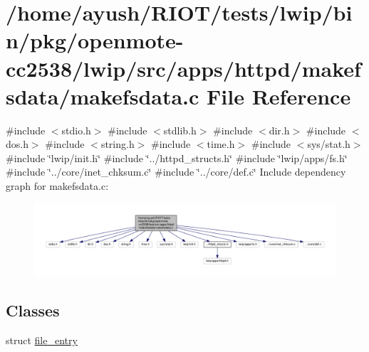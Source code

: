 \hypertarget{openmote-cc2538_2lwip_2src_2apps_2httpd_2makefsdata_2makefsdata_8c}{}\section{/home/ayush/\+R\+I\+O\+T/tests/lwip/bin/pkg/openmote-\/cc2538/lwip/src/apps/httpd/makefsdata/makefsdata.c File Reference}
\label{openmote-cc2538_2lwip_2src_2apps_2httpd_2makefsdata_2makefsdata_8c}
{\ttfamily \#include $<$stdio.\+h$>$}\newline
{\ttfamily \#include $<$stdlib.\+h$>$}\newline
{\ttfamily \#include $<$dir.\+h$>$}\newline
{\ttfamily \#include $<$dos.\+h$>$}\newline
{\ttfamily \#include $<$string.\+h$>$}\newline
{\ttfamily \#include $<$time.\+h$>$}\newline
{\ttfamily \#include $<$sys/stat.\+h$>$}\newline
{\ttfamily \#include \char`\"{}lwip/init.\+h\char`\"{}}\newline
{\ttfamily \#include \char`\"{}../httpd\+\_\+structs.\+h\char`\"{}}\newline
{\ttfamily \#include \char`\"{}lwip/apps/fs.\+h\char`\"{}}\newline
{\ttfamily \#include \char`\"{}../core/inet\+\_\+chksum.\+c\char`\"{}}\newline
{\ttfamily \#include \char`\"{}../core/def.\+c\char`\"{}}\newline
Include dependency graph for makefsdata.\+c\+:
\nopagebreak
\begin{figure}[H]
\begin{center}
\leavevmode
\includegraphics[width=350pt]{openmote-cc2538_2lwip_2src_2apps_2httpd_2makefsdata_2makefsdata_8c__incl}
\end{center}
\end{figure}
\subsection*{Classes}
\begin{DoxyCompactItemize}
\item 
struct \hyperlink{structfile__entry}{file\+\_\+entry}
\end{DoxyCompactItemize}
